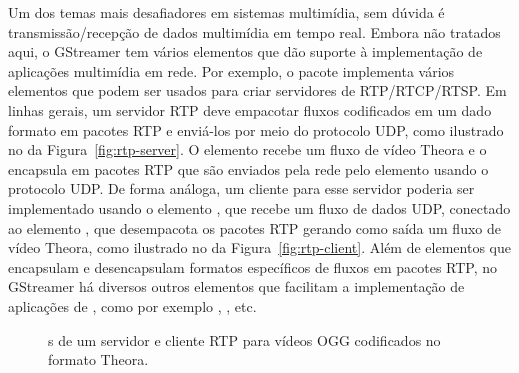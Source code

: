 Um dos temas mais desafiadores em sistemas multimídia, sem dúvida é
transmissão/recepção de dados multimídia em tempo real.  Embora não tratados
aqui, o GStreamer tem vários elementos que dão suporte à implementação de
aplicações multimídia em rede. Por exemplo, o pacote 
implementa vários elementos que podem ser usados para criar servidores de
 RTP/RTCP/RTSP. Em linhas gerais, um servidor RTP deve empacotar
fluxos codificados em um dado formato em pacotes RTP e enviá-los por meio do
protocolo UDP, como ilustrado no  da Figura~\ref{fig:rtp-server}.
O elemento  recebe um fluxo de vídeo Theora e o encapsula em
pacotes RTP que são enviados pela rede pelo elemento  usando o
protocolo UDP. De forma análoga, um cliente para esse servidor poderia ser
implementado usando o elemento , que recebe um fluxo de dados UDP,
conectado ao elemento , que desempacota os pacotes RTP
gerando como saída um fluxo de vídeo Theora, como ilustrado no  da
Figura~\ref{fig:rtp-client}. Além de elementos que encapsulam e desencapsulam
formatos específicos de fluxos em pacotes RTP, no GStreamer há diversos outros
elementos que facilitam a implementação de aplicações de , como
por exemplo , ,  etc.

\begin{figure}[H]
  \centering
  \caption{s de um servidor e cliente RTP para vídeos 
    OGG codificados no formato Theora.}
  \label{fig:pipe-rtp-server}
\end{figure}

